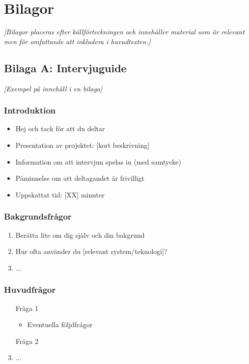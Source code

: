 \section{Bilagor}

\textit{[Bilagor placeras efter källförteckningen och innehåller material som är relevant men för omfattande att inkludera i huvudtexten.]}


\subsection{Bilaga A: Intervjuguide}

\textit{[Exempel på innehåll i en bilaga]}

\subsubsection{Introduktion}
\begin{itemize}
    \item Hej och tack för att du deltar
    \item Presentation av projektet: [kort beskrivning]
    \item Information om att intervjun spelas in (med samtycke)
    \item Påminnelse om att deltagandet är frivilligt
    \item Uppskattat tid: [XX] minuter
\end{itemize}

\subsubsection{Bakgrundsfrågor}
\begin{enumerate}
    \item Berätta lite om dig själv och din bakgrund
    \item Hur ofta använder du [relevant system/teknologi]?
    \item ...
\end{enumerate}

\subsubsection{Huvudfrågor}
\begin{enumerate}
    \item [Fråga 1]
    \begin{itemize}
        \item Eventuella följdfrågor
    \end{itemize}
    \item [Fråga 2]
    \item ...
\end{enumerate}

